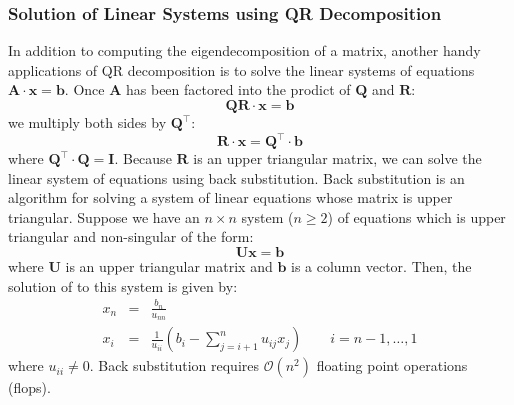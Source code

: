 \documentclass{article}[11pt]
\begin{document}
\subsubsection*{Solution of Linear Systems using QR Decomposition}
In addition to computing the eigendecomposition of a matrix, another handy applications of QR decomposition is to solve the linear systems of equations $\mathbf{A}\cdot\mathbf{x} = \mathbf{b}$.
Once $\mathbf{A}$ has been factored into the prodict of $\mathbf{Q}$ and $\mathbf{R}$:
\begin{equation}
\mathbf{Q}\mathbf{R}\cdot\mathbf{x} = \mathbf{b}
\end{equation}
we multiply both sides by $\mathbf{Q}^{\top}$:
\begin{equation}
\mathbf{R}\cdot\mathbf{x} = \mathbf{Q}^{\top}\cdot\mathbf{b}
\end{equation}
where $\mathbf{Q}^{\top}\cdot\mathbf{Q} = \mathbf{I}$. Because $\mathbf{R}$ is an upper triangular matrix, 
we can solve the linear system of equations using back substitution. Back substitution is an algorithm for solving a system of linear equations whose matrix is upper triangular.
Suppose we have an $n\times{n}$ system ($n\geq{2}$) of equations which is upper triangular and non-singular of the form:
\begin{equation*}
\mathbf{U}\mathbf{x} = \mathbf{b}
\end{equation*}
where $\mathbf{U}$ is an upper triangular matrix and $\mathbf{b}$ is a column vector.
Then, the solution of to this system is given by:
\begin{eqnarray*}
x_{n} & = & \frac{b_{n}}{u_{nn}} \\
x_{i} & = & \frac{1}{u_{ii}}\left(b_{i} - \sum_{j=i+1}^{n}u_{ij}x_{j}\right)\qquad{i=n-1,\dots,1}
\end{eqnarray*}
where $u_{ii}\neq{0}$. Back substitution requires $\mathcal{O}(n^{2})$ floating point operations (flops).
\end{document}
